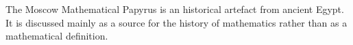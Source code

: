 \documentclass[12pt]{article}
\begin{document}
The Moscow Mathematical Papyrus is an historical artefact from ancient Egypt. It is discussed mainly as a source for the history of mathematics rather than as a mathematical definition.
\end{document}
